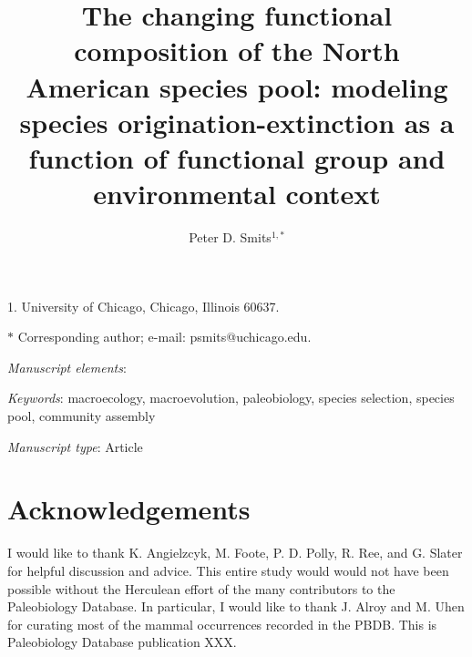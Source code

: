 \documentclass[11pt]{article}
\title{The changing functional composition of the North American species pool: modeling species origination-extinction as a function of functional group and environmental context}
\author{Peter D. Smits$^{1, \ast}$\\}
\date{}
\begin{document}
\maketitle

\noindent{}1. University of Chicago, Chicago, Illinois 60637.

\noindent{}$\ast$ Corresponding author; e-mail: psmits@uchicago.edu.

\bigskip

\textit{Manuscript elements}:

\bigskip

\textit{Keywords}: macroecology, macroevolution, paleobiology, species selection, species pool, community assembly

\bigskip

\textit{Manuscript type}: Article

\bigskip


\linenumbers
\modulolinenumbers[2]

\newpage{}












\section*{Acknowledgements}
I would like to thank K. Angielzcyk, M. Foote, P. D. Polly, R. Ree, and G. Slater for helpful discussion and advice. This entire study would would not have been possible without the Herculean effort of the many contributors to the Paleobiology Database. In particular, I would like to thank J. Alroy and M. Uhen for curating most of the mammal occurrences recorded in the PBDB. This is Paleobiology Database publication XXX.




\end{document}
